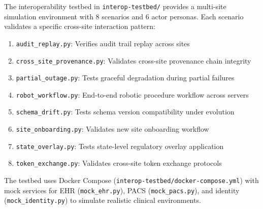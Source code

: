 The interoperability testbed in \texttt{interop-testbed/} provides a multi-site simulation environment with 8 scenarios and 6 actor personas. Each scenario validates a specific cross-site interaction pattern:

\begin{enumerate}[leftmargin=*]
\item \texttt{audit\_replay.py}: Verifies audit trail replay across sites
\item \texttt{cross\_site\_provenance.py}: Validates cross-site provenance chain integrity
\item \texttt{partial\_outage.py}: Tests graceful degradation during partial failures
\item \texttt{robot\_workflow.py}: End-to-end robotic procedure workflow across servers
\item \texttt{schema\_drift.py}: Tests schema version compatibility under evolution
\item \texttt{site\_onboarding.py}: Validates new site onboarding workflow
\item \texttt{state\_overlay.py}: Tests state-level regulatory overlay application
\item \texttt{token\_exchange.py}: Validates cross-site token exchange protocols
\end{enumerate}

The testbed uses Docker Compose (\texttt{interop-testbed/docker-compose.yml}) with mock services for EHR (\texttt{mock\_ehr.py}), PACS (\texttt{mock\_pacs.py}), and identity (\texttt{mock\_identity.py}) to simulate realistic clinical environments.

